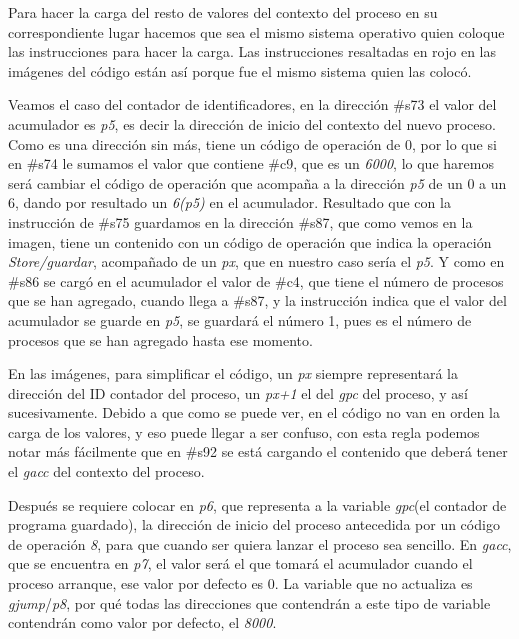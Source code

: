 \documentclass[letterpaper,12pt,oneside]{book}
\begin{document}
			Para hacer la carga del resto de valores del contexto del proceso en su correspondiente lugar hacemos que sea el mismo sistema operativo
			quien coloque las instrucciones para hacer la carga. Las instrucciones resaltadas en rojo en las imágenes del código 
			están así porque fue el mismo sistema quien las colocó.
   
            Veamos el caso del contador de identificadores, en la dirección
			\#s73 el valor del acumulador es \textit{p5}, es decir la dirección de inicio del contexto del nuevo proceso. Como es una dirección sin más,
			tiene un código de operación de 0, por lo que si en \#s74 le sumamos el valor que contiene \#c9, que es un \textit{6000}, lo que haremos
			será cambiar el código de operación que acompaña a la dirección \textit{p5} de un 0 a un 6, dando por resultado un \textit{6(p5)} en el acumulador.
			Resultado que con la instrucción de \#s75 guardamos en la dirección \#s87, que como vemos en la imagen, tiene un contenido con un código de operación
			que indica la operación \textit{Store/guardar}, acompañado de un \textit{px}, que en nuestro caso sería el \textit{p5}. Y como en \#s86 se cargó
			en el acumulador el valor de \#c4, que tiene el número de procesos que se han agregado, cuando llega a \#s87, y la instrucción indica que
			el valor del acumulador se guarde en \textit{p5}, se guardará el número 1, pues es el número de procesos que se han agregado hasta ese momento.
			
			En las imágenes, para simplificar el código, un \textit{px} siempre representará la dirección del ID contador del proceso, un
			\textit{px+1} el del \textit{gpc} del proceso, y así sucesivamente. Debido a que como se puede ver, en el código no van en orden la carga de los valores,
			y eso puede llegar a ser confuso, con esta regla podemos notar más fácilmente que en \#s92 se está cargando el contenido que deberá tener
			el \textit{gacc} del contexto del proceso.
			
			Después se requiere colocar en \textit{p6}, que representa a la variable \textit{gpc}(el contador de programa guardado), la dirección
			de inicio del proceso antecedida por un código de operación \textit{8}, para que cuando ser quiera lanzar el proceso sea sencillo. En \textit{gacc}, que
			se encuentra en \textit{p7}, el valor será el  que tomará el acumulador cuando el proceso arranque, ese valor por defecto es 0. La variable que
			no actualiza es \textit{gjump}/\textit{p8}, por qué todas las direcciones que contendrán 
            a este tipo de variable contendrán como valor por defecto, el \textit{8000}. 
            
\end{document}
